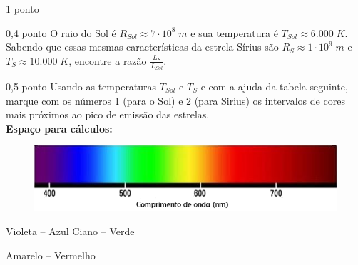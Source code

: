 \documentclass{../lista}
\begin{document}
\begin{questao}{1 ponto}
		\begin{pergunta}{0,4 ponto}
			O raio do Sol é $R_{Sol} \approx 7 \cdot 10^8 \; m$ e sua temperatura é $T_{Sol} \approx 6.000 \; K$. Sabendo que essas mesmas características da estrela Sírius são $R_S \approx 1 \cdot 10^9 \; m$ e $T_S \approx 10.000 \; K$, encontre a razão $\frac{L_S}{L_{Sol}}$.


		\end{pergunta}

		\begin{pergunta}{0,5 ponto}
			Usando as temperaturas $T_{Sol}$ e $T_S$ e com a ajuda da tabela seguinte, marque com os números 1 (para o Sol) e 2 (para Sirius) os intervalos de cores mais próximos ao pico de emissão das estrelas. \\

			\textbf{Espaço para cálculos:}

			\begin{figure}[H]
				\centering
				\includegraphics[scale=0.5]{./img/4.png}
			\end{figure}
			\begin{multicols}{3} \begin{alternativas}
				\alternativaMarcada[$\red{2}$] Violeta -- Azul
				\alternativaMarcada[$\red{1}$] Ciano -- Verde
				\item Amarelo -- Vermelho
			\end{alternativas} \end{multicols}
		\end{pergunta}
	\end{questao}
\end{document}

